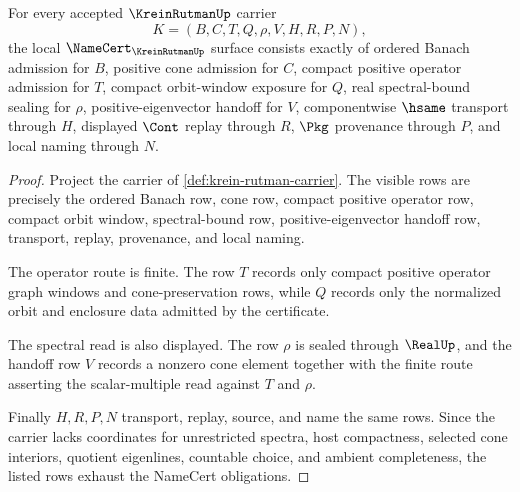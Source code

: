\begin{theorem}
\label{thm:krein-rutman-namecert-obligations}
For every accepted $\KreinRutmanUp$ carrier
$$
K=(B,C,T,Q,\rho,V,H,R,P,N),
$$
the local $\NameCert_{\KreinRutmanUp}$ surface consists exactly of ordered Banach admission for $B$, positive cone admission for $C$, compact positive operator admission for $T$, compact orbit-window exposure for $Q$, real spectral-bound sealing for $\rho$, positive-eigenvector handoff for $V$, componentwise $\hsame$ transport through $H$, displayed $\Cont$ replay through $R$, $\Pkg$ provenance through $P$, and local naming through $N$.
\end{theorem}
\begin{proof}
Project the carrier of \autoref{def:krein-rutman-carrier}. The visible rows are precisely the ordered Banach row, cone row, compact positive operator row, compact orbit window, spectral-bound row, positive-eigenvector handoff row, transport, replay, provenance, and local naming.

The operator route is finite. The row $T$ records only compact positive operator graph windows and cone-preservation rows, while $Q$ records only the normalized orbit and enclosure data admitted by the certificate.

The spectral read is also displayed. The row $\rho$ is sealed through $\RealUp$, and the handoff row $V$ records a nonzero cone element together with the finite route asserting the scalar-multiple read against $T$ and $\rho$.

Finally $H,R,P,N$ transport, replay, source, and name the same rows. Since the carrier lacks coordinates for unrestricted spectra, host compactness, selected cone interiors, quotient eigenlines, countable choice, and ambient completeness, the listed rows exhaust the NameCert obligations.
\end{proof}

